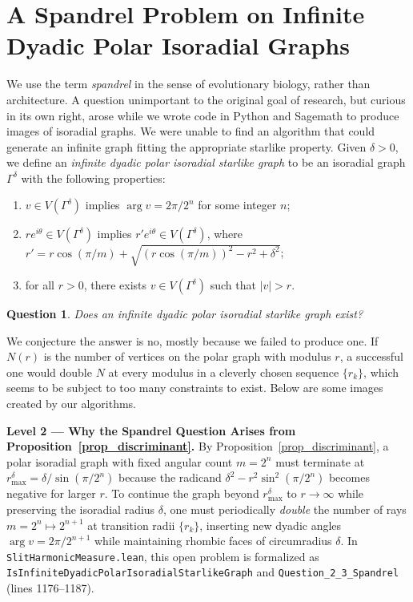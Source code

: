 \documentclass[11pt,reqno]{amsart}
\newtheorem{ques}[thm]{Question}
\numberwithin{equation}{section}
\begin{document}
\section{A Spandrel Problem on Infinite Dyadic Polar Isoradial Graphs}

We use the term \textit{spandrel} in the sense of evolutionary biology, rather than architecture. A question unimportant to the original goal of research, but curious in its own right, arose while we wrote code in Python and Sagemath to produce images of isoradial graphs. We were unable to find an algorithm that could generate an infinite graph fitting the appropriate starlike property. Given $\delta > 0$, we define an \textit{infinite dyadic polar isoradial starlike graph} to be an isoradial graph $\varGamma^{\delta}$ with the following properties:

\begin{enumerate}
\item[(Dyadic)] $v \in V(\varGamma^{\delta})$ implies $\arg v = 2\pi / 2^n$ for some integer $n$;
\item[(Starlike)] $re^{i\theta} \in V(\varGamma^{\delta})$ implies $r' e^{i\theta} \in V(\varGamma^{\delta})$, where $r' = r \cos(\pi/m) + \sqrt{(r \cos(\pi/m))^2 - r^2 + \delta^2}$;
\item[(Infinite)] for all $r > 0$, there exists $v \in V(\varGamma^{\delta})$ such that $|v| > r$.
\end{enumerate}

\begin{ques} \label{spandrel}
Does an infinite dyadic polar isoradial starlike graph exist?
\end{ques}

We conjecture the answer is no, mostly because we failed to produce one. If $N(r)$ is the number of vertices on the polar graph with modulus $r$, a successful one would double $N$ at every modulus in a cleverly chosen sequence $\{r_k\}$, which seems to be subject to too many constraints to exist. Below are some images created by our algorithms.

\begin{leveltwo}
\noindent\textbf{\textcolor{l2border}{Level 2 --- Why the Spandrel Question Arises from Proposition~\ref{prop_discriminant}.}}
By Proposition~\ref{prop_discriminant}, a polar isoradial graph with fixed angular count $m = 2^n$ must terminate at $r_{\max}^{\delta} = \delta / \sin(\pi / 2^n)$ because the radicand $\delta^2 - r^2 \sin^2(\pi / 2^n)$ becomes negative for larger $r$. To continue the graph beyond $r_{\max}^{\delta}$ to $r \to \infty$ while preserving the isoradial radius $\delta$, one must periodically \emph{double} the number of rays $m = 2^n \mapsto 2^{n+1}$ at transition radii $\{r_k\}$, inserting new dyadic angles $\arg v = 2\pi / 2^{n+1}$ while maintaining rhombic faces of circumradius $\delta$. In \texttt{SlitHarmonicMeasure.lean}, this open problem is formalized as \texttt{IsInfiniteDyadicPolarIsoradialStarlikeGraph} and \texttt{Question\_2\_3\_Spandrel} (lines 1176--1187).
\end{leveltwo}
\end{document}
